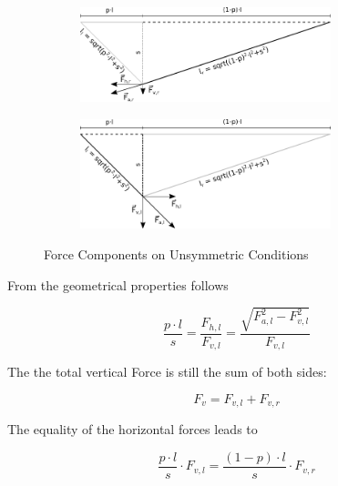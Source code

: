 \begin{figure}[htb] \centering
	\begin{subfigure}{\textwidth} \centering
		\includegraphics[width=0.8\textwidth]{images/slacklineWithForcesUnsymmetricRightSide.pdf}
	\end{subfigure} \par\bigskip
	\begin{subfigure}{\textwidth} \centering
		\includegraphics[width=0.8\textwidth]{images/slacklineWithForcesUnsymmetricLeftSide.pdf}
	\end{subfigure}
	\caption{Force Components on Unsymmetric Conditions }
	\label{fig:slacklineWithForcesUnsymmetric}
\end{figure}

From the geometrical properties follows

\begin{equation}
	\frac{p\cdot l}{s} = \frac{F_{h,l}}{F_{v,l}} = \frac{ \sqrt{F_{a,l}^2 - F_{v,l}^2 }}{F_{v,l}}
	\label{eqn:geometricPropertiesUnsymmetric}
\end{equation}

The the total vertical Force is still the sum of both sides:

\begin{equation}
	F_v = F_{v,l} + F_{v,r}
	\label{eqn:verticalForce}
\end{equation}

The equality of the horizontal forces leads to

\begin{equation}
	\frac{p\cdot l}{s}\cdot F_{v,l} = \frac{(1-p)\cdot l}{s}\cdot F_{v,r} 
	\label{eqn:horizontalEquality}
\end{equation}

